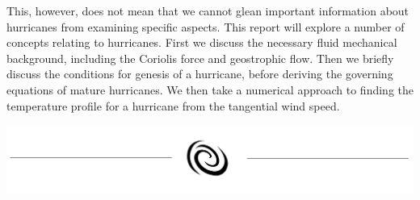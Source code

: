 This, however, does not mean that we cannot glean important information about hurricanes from examining specific aspects. This report will explore a number of concepts relating to hurricanes. First we discuss the necessary fluid mechanical background, including the Coriolis force and geostrophic flow. Then we briefly discuss the conditions for genesis of a hurricane, before deriving the governing equations of mature hurricanes. We then take a numerical approach to finding the temperature profile for a hurricane from the tangential wind speed. 

\begin{center}
    \includegraphics[width=0.8\linewidth]{assets/hurricane.png}
\end{center}
